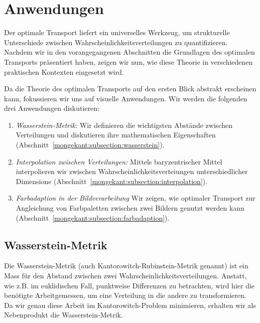 %
%
%
%
\section{Anwendungen%
\label{mongekant:section:teil3}}

Der optimale Transport liefert ein universelles Werkzeug,
um strukturelle Unterschiede zwischen Wahrscheinlichkeitsverteilungen zu quantifizieren.
Nachdem wir in den vorangegangenen Abschnitten
die Grundlagen des optimalen Transports präsentiert haben,
zeigen wir nun,
wie diese Theorie in verschiedenen praktischen Kontexten eingesetzt wird.

Da die Theorie des optimalen Transports auf den ersten Blick abstrakt erscheinen kann,
fokussieren wir uns auf visuelle Anwendungen.
Wir werden die folgenden drei Anwendungen diskutieren:
\begin{enumerate}
\item \emph{Wasserstein‑Metrik:}
Wir definieren die wichtigsten Abstände zwischen Verteilungen und
diskutieren ihre mathematischen Eigenschaften
(Abschnitt~\ref{mongekant:subsection:wasserstein}).
\item \emph{Interpolation zwischen Verteilungen:}
Mittels baryzentrischer Mittel interpolieren
wir zwischen Wahrscheinlichkeits­verteiungen unterschiedlicher Dimensione
(Abschnitt~\ref{mongekant:subsection:interpolation}).
\item \emph{Farbadaption in der Bildverarbeitung}
Wir zeigen,
wie optimaler Transport zur Angleichung von Farbpaletten
zwischen zwei Bildern genutzt werden kann
(Abschnitt~\ref{mongekant:subsection:farbadaption}).
\end{enumerate}

\subsection{Wasserstein-Metrik%
\label{mongekant:subsection:wasserstein}}

Die Wasserstein-Metrik (auch Kantorowitch-Rubinstein-Metrik genannt)
ist ein Mass für den Abstand zwischen zwei Wahrscheinlichkeitsverteilungen.
Anstatt,
wie z.B. im euklidischen Fall,
punktweise Differenzen zu betrachten,
wird hier die benötigte \glqq Arbeit\grqq gemessen,
um eine Verteilung in die andere zu transformieren.
Da wir genau diese Arbeit im Kantorowitch-Problem minimieren,
erhalten wir als Nebenprodukt die Wasserstein-Metrik.

